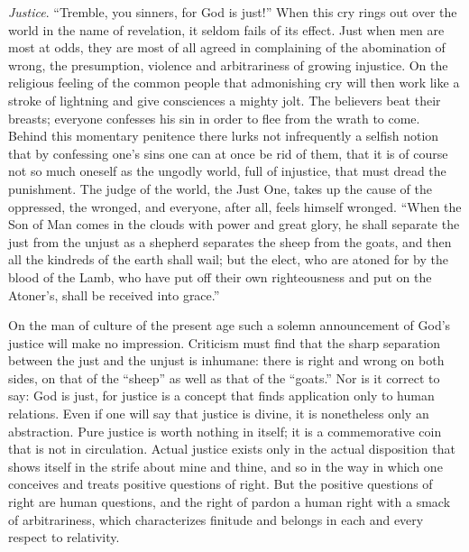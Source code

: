\documentclass[12pt,a4paper,openany]{book}
\newcommand{\opage}[1]{\marginnote{\footnotesize\textit{[#1]}}}
\begin{document}
\opage{104}\emph{Justice}. ``Tremble, you sinners, for God is just!'' When this cry
rings out over the world in the name of revelation, it seldom fails of its
effect. Just when men are most at odds, they are most of all agreed in
complaining of the abomination of wrong, the presumption, violence and
arbitrariness of growing injustice. On the religious feeling of the
common people that admonishing cry will then work like a stroke of
lightning and give consciences a mighty jolt. The believers beat their
breasts; everyone confesses his sin in order to flee from the wrath to
come. Behind this momentary penitence there lurks not infrequently a
selfish notion that by confessing one's sins one can at once be rid of
them, that it is of course not so much oneself as the ungodly world, full
of injustice, that must dread the punishment. The judge of the world, the
Just One, takes up the cause of the oppressed, the wronged, and everyone,
after all, feels himself wronged. ``When the Son of Man comes in the
clouds with power and great glory, he shall separate the just from the
unjust as a shepherd separates the sheep from the goats, and then all the
kindreds of the earth shall wail; but the elect, who are atoned for by the
blood of the Lamb, who have put off their own righteousness and put on
the Atoner's, shall be received into grace.''

On the man of culture of the present age such a solemn announcement of
God's justice will make no impression. Criticism must find that the
sharp separation between the just and the unjust is inhumane: there is
right and wrong on both sides, on that of the ``sheep'' as well as that
of the ``goats.'' \opage{105}Nor is it correct to say: God is just, for justice is a
concept that finds application only to human relations. Even if one will
say that justice is divine, it is nonetheless only an abstraction. Pure
justice is worth nothing in itself; it is a commemorative coin that is
not in circulation. Actual justice exists only in the actual disposition
that shows itself in the strife about mine and thine, and so in the way in
which one conceives and treats positive questions of right. But the
positive questions of right are human questions, and the right of pardon
a human right with a smack of arbitrariness, which characterizes finitude
and belongs in each and every respect to relativity.
\end{document}
